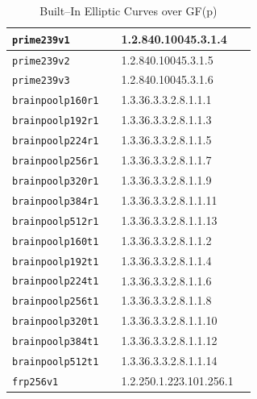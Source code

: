 \documentclass[synpaper]{book}
\begin{document}
\begin{table}[H]
\begin{center}
\begin{tabular}{|l|l|l|l|}
\hline \texttt{prime239v1}      &                                      & 1.2.840.10045.3.1.4   \\
\hline \texttt{prime239v2}      &                                      & 1.2.840.10045.3.1.5   \\
\hline \texttt{prime239v3}      &                                      & 1.2.840.10045.3.1.6   \\
\hline \texttt{brainpoolp160r1} &                                      & 1.3.36.3.3.2.8.1.1.1  \\
\hline \texttt{brainpoolp192r1} &                                      & 1.3.36.3.3.2.8.1.1.3  \\
\hline \texttt{brainpoolp224r1} &                                      & 1.3.36.3.3.2.8.1.1.5  \\
\hline \texttt{brainpoolp256r1} &                                      & 1.3.36.3.3.2.8.1.1.7  \\
\hline \texttt{brainpoolp320r1} &                                      & 1.3.36.3.3.2.8.1.1.9  \\
\hline \texttt{brainpoolp384r1} &                                      & 1.3.36.3.3.2.8.1.1.11 \\
\hline \texttt{brainpoolp512r1} &                                      & 1.3.36.3.3.2.8.1.1.13 \\
\hline \texttt{brainpoolp160t1} &                                      & 1.3.36.3.3.2.8.1.1.2  \\
\hline \texttt{brainpoolp192t1} &                                      & 1.3.36.3.3.2.8.1.1.4  \\
\hline \texttt{brainpoolp224t1} &                                      & 1.3.36.3.3.2.8.1.1.6  \\
\hline \texttt{brainpoolp256t1} &                                      & 1.3.36.3.3.2.8.1.1.8  \\
\hline \texttt{brainpoolp320t1} &                                      & 1.3.36.3.3.2.8.1.1.10 \\
\hline \texttt{brainpoolp384t1} &                                      & 1.3.36.3.3.2.8.1.1.12 \\
\hline \texttt{brainpoolp512t1} &                                      & 1.3.36.3.3.2.8.1.1.14 \\
\hline \texttt{frp256v1}        &                                      & 1.2.250.1.223.101.256.1 \\
\hline
\end{tabular}
\caption{Built--In Elliptic Curves over GF(p)}
\end{center}
\label{fig:builtincurves}
\end{table}
\end{document}
